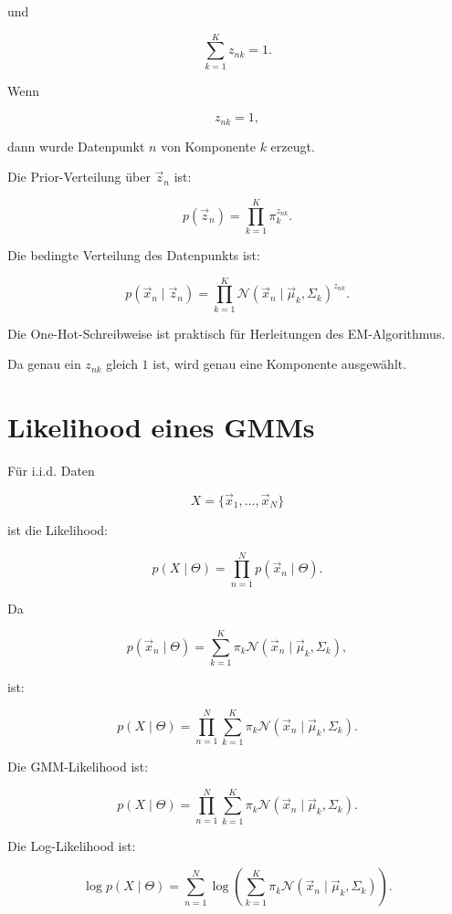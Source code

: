und

\[
    \sum_{k=1}^{K}
    z_{nk}=1.
\]

Wenn

\[
    z_{nk}=1,
\]

dann wurde Datenpunkt \(n\) von Komponente \(k\) erzeugt.

Die Prior-Verteilung über \(\vec{z}_n\) ist:

\[
    p(\vec{z}_n)
    =
    \prod_{k=1}^{K}
    \pi_k^{z_{nk}}.
\]

Die bedingte Verteilung des Datenpunkts ist:

\[
    p(\vec{x}_n\mid\vec{z}_n)
    =
    \prod_{k=1}^{K}
    \mathcal{N}(\vec{x}_n\mid\vec{\mu}_k,\Sigma_k)^{z_{nk}}.
\]

\begin{notebox}
Die One-Hot-Schreibweise ist praktisch für Herleitungen des EM-Algorithmus.

Da genau ein \(z_{nk}\) gleich \(1\) ist, wird genau eine Komponente ausgewählt.
\end{notebox}

\section{Likelihood eines GMMs}

Für i.i.d. Daten

\[
    X
    =
    \{\vec{x}_1,\dots,\vec{x}_N\}
\]

ist die Likelihood:

\[
    p(X\mid\Theta)
    =
    \prod_{n=1}^{N}
    p(\vec{x}_n\mid\Theta).
\]

Da

\[
    p(\vec{x}_n\mid\Theta)
    =
    \sum_{k=1}^{K}
    \pi_k
    \mathcal{N}(\vec{x}_n\mid\vec{\mu}_k,\Sigma_k),
\]

ist:

\[
    p(X\mid\Theta)
    =
    \prod_{n=1}^{N}
    \sum_{k=1}^{K}
    \pi_k
    \mathcal{N}(\vec{x}_n\mid\vec{\mu}_k,\Sigma_k).
\]

\begin{definitionbox}
Die GMM-Likelihood ist:

\[
    p(X\mid\Theta)
    =
    \prod_{n=1}^{N}
    \sum_{k=1}^{K}
    \pi_k
    \mathcal{N}(\vec{x}_n\mid\vec{\mu}_k,\Sigma_k).
\]
\end{definitionbox}

Die Log-Likelihood ist:

\[
    \log p(X\mid\Theta)
    =
    \sum_{n=1}^{N}
    \log
    \left(
        \sum_{k=1}^{K}
        \pi_k
        \mathcal{N}(\vec{x}_n\mid\vec{\mu}_k,\Sigma_k)
    \right).
\]

